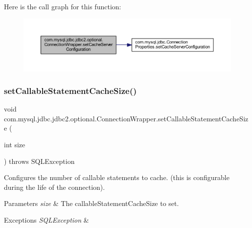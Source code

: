 Here is the call graph for this function\+:
\nopagebreak
\begin{figure}[H]
\begin{center}
\leavevmode
\includegraphics[width=350pt]{classcom_1_1mysql_1_1jdbc_1_1jdbc2_1_1optional_1_1_connection_wrapper_acae485e2428a7a687985cf493daa6dc1_cgraph}
\end{center}
\end{figure}
\mbox{\label{classcom_1_1mysql_1_1jdbc_1_1jdbc2_1_1optional_1_1_connection_wrapper_a8e6ffb0bce5a7d16da96043683ec3f18}} 
\subsubsection{\texorpdfstring{set\+Callable\+Statement\+Cache\+Size()}{setCallableStatementCacheSize()}}
{\footnotesize\ttfamily void com.\+mysql.\+jdbc.\+jdbc2.\+optional.\+Connection\+Wrapper.\+set\+Callable\+Statement\+Cache\+Size (\begin{DoxyParamCaption}\item[{int}]{size }\end{DoxyParamCaption}) throws S\+Q\+L\+Exception}

Configures the number of callable statements to cache. (this is configurable during the life of the connection).


\begin{DoxyParams}{Parameters}
{\em size} & The callable\+Statement\+Cache\+Size to set. \\
\hline
\end{DoxyParams}

\begin{DoxyExceptions}{Exceptions}
{\em S\+Q\+L\+Exception} & \\
\hline
\end{DoxyExceptions}


